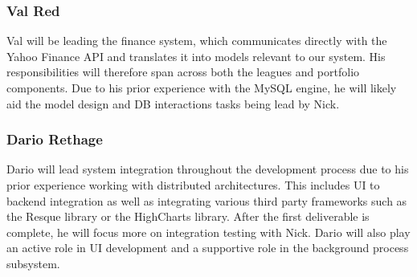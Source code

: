 \subsubsection{Val Red}
Val will be leading the finance system, which communicates directly with the Yahoo Finance API and translates it into models relevant to our system. His responsibilities will therefore span across both the leagues and portfolio components. Due to his prior experience with the MySQL engine, he will likely aid the model design and DB interactions tasks being lead by Nick. \\
\subsubsection{Dario Rethage}
Dario will lead system integration throughout the development process due to his prior experience working with distributed architectures. This includes UI to backend integration as well as integrating various third party frameworks such as the Resque library or the HighCharts library. After the first deliverable is complete, he will focus more on integration testing with Nick. Dario will also play an active role in UI development and a supportive role in the background process subsystem. \\

